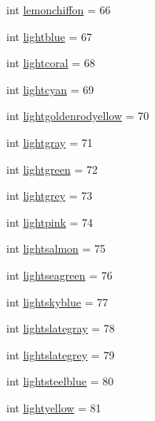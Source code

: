 \begin{DoxyCompactItemize}
\item 
int \hyperlink{classbridges_1_1named__color_1_1_named_color_a77e4011bdf8fc70456c2ff197b78d7b5}{lemonchiffon} = 66
\item 
int \hyperlink{classbridges_1_1named__color_1_1_named_color_a66aba171251724a6fc4ba180a4ff78d6}{lightblue} = 67
\item 
int \hyperlink{classbridges_1_1named__color_1_1_named_color_a35c91829cf18d0f8a2892411bae23eda}{lightcoral} = 68
\item 
int \hyperlink{classbridges_1_1named__color_1_1_named_color_af52d155b6ef4eed72f56f95df59d9125}{lightcyan} = 69
\item 
int \hyperlink{classbridges_1_1named__color_1_1_named_color_a316d825baa9306e4f3ccb9aabbe0a6cc}{lightgoldenrodyellow} = 70
\item 
int \hyperlink{classbridges_1_1named__color_1_1_named_color_a02eb80e807d44dbb233cf8f217971a70}{lightgray} = 71
\item 
int \hyperlink{classbridges_1_1named__color_1_1_named_color_a600e096299c61ae9a2997534aee92271}{lightgreen} = 72
\item 
int \hyperlink{classbridges_1_1named__color_1_1_named_color_a14d7aa8be4da1dc0d695e1403a3ae47e}{lightgrey} = 73
\item 
int \hyperlink{classbridges_1_1named__color_1_1_named_color_a32e9e9491919f01f236ce0447abb5bfa}{lightpink} = 74
\item 
int \hyperlink{classbridges_1_1named__color_1_1_named_color_a616e82749b8c7711ede2554ce8e3a879}{lightsalmon} = 75
\item 
int \hyperlink{classbridges_1_1named__color_1_1_named_color_a05e129daa9b269d445da99ef16518fa1}{lightseagreen} = 76
\item 
int \hyperlink{classbridges_1_1named__color_1_1_named_color_aca6606444ac438d10f442d13e2daa475}{lightskyblue} = 77
\item 
int \hyperlink{classbridges_1_1named__color_1_1_named_color_aa7f81bd8d7d793a8b77487153fb6affe}{lightslategray} = 78
\item 
int \hyperlink{classbridges_1_1named__color_1_1_named_color_a36a3b92bad32383bd89c83166f3d0225}{lightslategrey} = 79
\item 
int \hyperlink{classbridges_1_1named__color_1_1_named_color_a1172078d2f432e43d290c3daa6019b14}{lightsteelblue} = 80
\item 
int \hyperlink{classbridges_1_1named__color_1_1_named_color_acee72a5014856c8971bde9ad1f6f2b69}{lightyellow} = 81
\item 

\end{DoxyCompactItemize}
